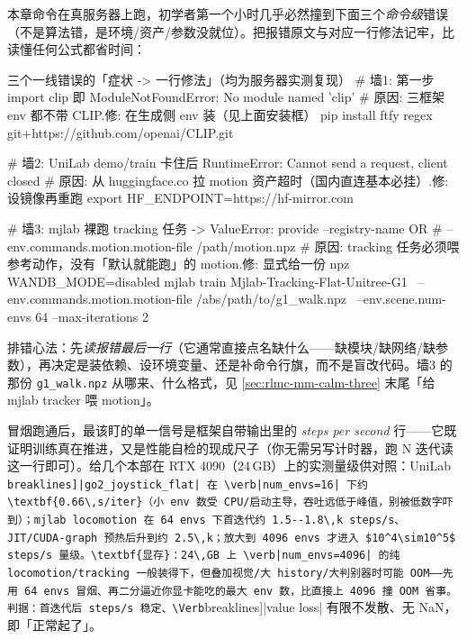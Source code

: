 \begin{pitfall}
本章命令在真服务器上跑，初学者第一个小时几乎必然撞到下面三个\emph{命令级}错误（不是算法错，是环境/资产/参数没就位）。把报错原文与对应一行修法记牢，比读懂任何公式都省时间：

\begin{codebox}[bash]{三个一线错误的「症状 -> 一行修法」（均为服务器实测复现）}
# 墙1: 第一步 import clip 即 ModuleNotFoundError: No module named 'clip'
#   原因: 三框架 env 都不带 CLIP.修: 在生成侧 env 装（见上面安装框）
pip install ftfy regex git+https://github.com/openai/CLIP.git

# 墙2: UniLab demo/train 卡住后 RuntimeError: Cannot send a request, client closed
#   原因: 从 huggingface.co 拉 motion 资产超时（国内直连基本必挂）.修: 设镜像再重跑
export HF_ENDPOINT=https://hf-mirror.com

# 墙3: mjlab 裸跑 tracking 任务 -> ValueError: provide --registry-name OR
#       --env.commands.motion.motion-file /path/motion.npz
#   原因: tracking 任务必须喂参考动作，没有「默认就能跑」的 motion.修: 显式给一份 npz
WANDB_MODE=disabled mjlab train Mjlab-Tracking-Flat-Unitree-G1 \
    --env.commands.motion.motion-file /abs/path/to/g1_walk.npz \
    --env.scene.num-envs 64 --max-iterations 2
\end{codebox}

\noindent 排错心法：先\emph{读报错最后一行}（它通常直接点名缺什么——缺模块/缺网络/缺参数），再决定是装依赖、设环境变量、还是补命令行旗，而不是盲改代码。墙3 的那份 \verb|g1_walk.npz| 从哪来、什么格式，见 \cref{sec:rlmc-mm-calm-three} 末尾「给 mjlab tracker 喂 motion」。
\end{pitfall}

\begin{note}
冒烟跑通后，最该盯的单一信号是框架自带输出里的 \emph{steps per second} 行——它既证明训练真在推进，又是性能自检的现成尺子（你无需另写计时器，跑 N 迭代读这一行即可）。给几个本部在 RTX 4090（24\,GB）上的实测量级供对照：UniLab \Verb[breaklines]|go2_joystick_flat| 在 \verb|num_envs=16| 下约 \textbf{0.66\,s/iter}（小 env 数受 CPU/启动主导，吞吐远低于峰值，别被低数字吓到）；mjlab locomotion 在 64 envs 下首迭代约 1.5--1.8\,k steps/s、JIT/CUDA-graph 预热后升到约 2.5\,k；放大到 4096 envs 才进入 $10^4\sim10^5$ steps/s 量级。\textbf{显存}：24\,GB 上 \verb|num_envs=4096| 的纯 locomotion/tracking 一般装得下，但叠加视觉/大 history/大判别器时可能 OOM——先用 64 envs 冒烟、再二分逼近你显卡能吃的最大 env 数，比直接上 4096 撞 OOM 省事。判据：首迭代后 steps/s 稳定、\Verb[breaklines]|value loss| 有限不发散、无 NaN，即「正常起了」。
\end{note}

